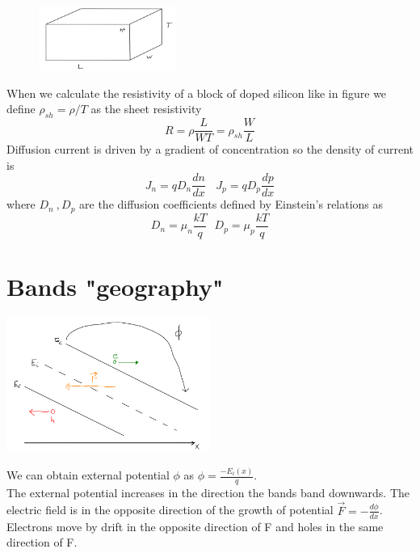 \begin{figure}
\includegraphics[width=0.4\textwidth]{shrho.png}
\end{figure}

When we calculate the resistivity of a block of doped silicon like in figure we define $\rho_{sh}=\rho/T$ as the sheet resistivity
\begin{equation}
R=\rho\frac{L}{WT}=\rho_{sh}\frac{W}{L} 
\end{equation}
Diffusion current is driven by a gradient of concentration so the density of current is 
\begin{equation}
J_n=qD_n\frac{dn}{dx} \ \ \ \ J_p=qD_p\frac{dp}{dx}
\end{equation}
where $D_n\ ,D_p$ are the diffusion coefficients defined by Einstein's relations as 
\begin{equation}
D_n=\mu_n\frac{kT}{q}\ \ \ D_p=\mu_p\frac{kT}{q}
\end{equation}
\newline
\section{Bands "geography"}

\centering
\includegraphics[width=0.5\textwidth]{bandsgeo.png}\\
\raggedright

We can obtain external potential $\phi$ as $\phi=\frac{-E_i(x)}{q}$.\\
The external potential increases in the direction the bands band downwards. The electric field is in the opposite direction of the growth of potential $\vec{F}=-\frac{d\phi}{dx}$.\\
Electrons move by drift in the opposite direction of F and holes in the same direction of F.\\

